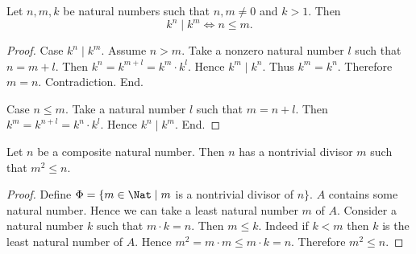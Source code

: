 \begin{forthel}
  \begin{proposition}
    Let $n, m, k$ be natural numbers such that $n, m \neq 0$ and $k > 1$.
    Then \[ k^{n} \mid k^{m} \iff n \leq m. \]
  \end{proposition}
  \begin{proof}
    Case $k^{n} \mid k^{m}$.
      Assume $n > m$.
      Take a nonzero natural number $l$ such that $n = m + l$.
      Then $k^{n}
        = k^{m + l}
        = k^{m} \cdot k^{l}$.
      Hence $k^{m} \mid k^{n}$.
      Thus $k^{m} = k^{n}$.
      Therefore $m = n$.
      Contradiction.
    End.

    Case $n \leq m$.
      Take a natural number $l$ such that $m = n + l$.
      Then $k^{m}
        = k^{n + l}
        = k^{n} \cdot k^{l}$.
      Hence $k^{n} \mid k^{m}$.
    End.
  \end{proof}
\end{forthel}

\begin{forthel}
  \begin{proposition}
    Let $n$ be a composite natural number.
    Then $n$ has a nontrivial divisor $m$ such that $m^{2} \leq n$.
  \end{proposition}
  \begin{proof}
    Define $\Phi = \{ m \in \Nat \mid m$ is a nontrivial divisor of $n \}$.
    $A$ contains some natural number.
    Hence we can take a least natural number $m$ of $A$.
    Consider a natural number $k$ such that $m \cdot k = n$.
    Then $m \leq k$.
    Indeed if $k < m$ then $k$ is the least natural number of $A$.
    Hence $m^{2} = m \cdot m \leq m \cdot k = n$.
    Therefore $m^{2} \leq n$.
  \end{proof}
\end{forthel}

